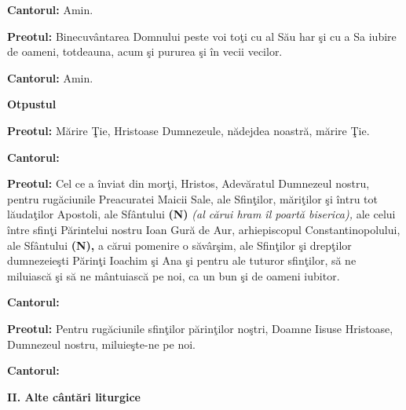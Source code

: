 \documentclass[11pt,letterpaper]{book} \usepackage{ucs}
\newcommand{\mychapter}[1]{\begin{center}{\Huge \bf #1}\end{center}}
\newcommand{\mysection}[1]{\begin{center}{\Large \bf #1}\end{center}}
\begin{document}
  {\bf Cantorul:} Amin.


  {\bf Preotul:} Binecuvântarea Domnului peste voi toţi cu al Său har
  şi cu a Sa iubire de oameni, totdeauna, acum şi pururea şi în vecii
  vecilor.

  {\bf Cantorul:} Amin.

  \mysection{Otpustul}

  {\bf Preotul:} Mărire Ţie, Hristoase Dumnezeule, nădejdea noastră,
  mărire Ţie.

  {\bf Cantorul:}


  {\bf Preotul:} Cel ce a înviat din morţi, Hristos, Adevăratul
  Dumnezeul nostru, pentru rugăciunile Preacuratei Maicii Sale, ale
  Sfinţilor, măriţilor şi întru tot lăudaţilor Apostoli, ale Sfântului
  {\bf (N)} {\em (al cărui hram îl poartă biserica),} ale celui
  între sfinţi Părintelui nostru Ioan Gură de Aur, arhiepiscopul
  Constantinopolului, ale Sfântului {\bf (N),} a cărui pomenire o
  săvârşim, ale Sfinţilor şi drepţilor dumnezeieşti Părinţi Ioachim şi
  Ana şi pentru ale tuturor sfinţilor, să ne miluiască şi să ne
  mântuiască pe noi, ca un bun şi de oameni iubitor.

  {\bf Cantorul:}
  \begin{center}
  \end{center}

  {\bf Preotul:} Pentru rugăciunile sfinţilor părinţilor noştri,
  Doamne Iisuse Hristoase, Dumnezeul nostru, miluieşte-ne pe noi.

  {\bf Cantorul:}
  \begin{center}
  \end{center}
  
  \raggedbottom
  \pagebreak

  \mychapter{II. Alte cântări liturgice}

  \label{de_tine_se_bucura}
  \pagebreak

  \label{ingerul_a_strigat}
  \pagebreak

  \pagebreak

  \pagebreak

  \pagebreak

\end{document}
